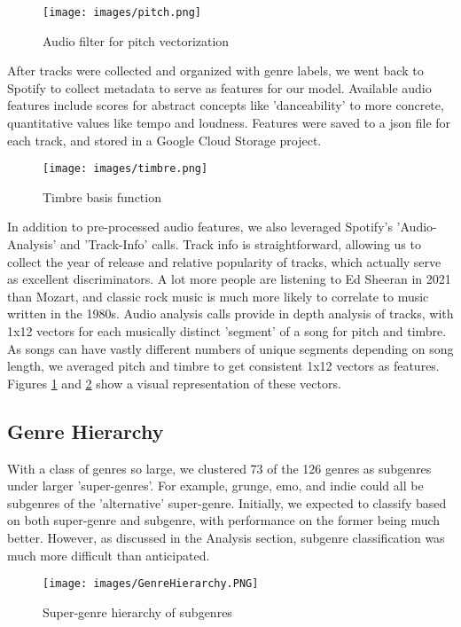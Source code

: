 \documentclass[conference]{IEEEtran}
\begin{document}
\begin{figure}[htbp]
\centerline{\texttt{[image: images/pitch.png]}}
\caption{Audio filter for pitch vectorization}
\label{fig:pitch}
\end{figure}

After tracks were collected and organized with genre labels, we went back to Spotify to collect metadata to serve as features for our model. Available audio features include scores for abstract concepts like 'danceability' to more concrete, quantitative values like tempo and loudness. Features were saved to a json file for each track, and stored in a Google Cloud Storage project. 

\begin{figure}[htbp]
\centerline{\texttt{[image: images/timbre.png]}}
\caption{Timbre basis function}
\label{fig:timbre}
\end{figure}

In addition to pre-processed audio features, we also leveraged Spotify's 'Audio-Analysis' and 'Track-Info' calls. Track info is straightforward, allowing us to collect the year of release and relative popularity of tracks, which actually serve as excellent discriminators. A lot more people are listening to Ed Sheeran in 2021 than Mozart, and classic rock music is much more likely to correlate to music written in the 1980s. Audio analysis calls provide in depth analysis of tracks, with 1x12 vectors for each musically distinct 'segment' of a song for pitch and timbre. As songs can have vastly different numbers of unique segments depending on song length, we averaged pitch and timbre to get consistent 1x12 vectors as features. Figures \ref{fig:pitch} and \ref{fig:timbre} show a visual representation of these vectors.

\subsection{Genre Hierarchy}

With a class of genres so large, we clustered 73 of the 126 genres as subgenres under larger 'super-genres'. For example, grunge, emo, and indie could all be subgenres of the 'alternative' super-genre. Initially, we expected to classify based on both super-genre and subgenre, with performance on the former being much better. However, as discussed in the Analysis section, subgenre classification was much more difficult than anticipated. 

\begin{figure}[htbp]
\centerline{\texttt{[image: images/GenreHierarchy.PNG]}}
\caption{Super-genre hierarchy of subgenres}
\label{fig:GenreHierarchy}
\end{figure}
\end{document}
